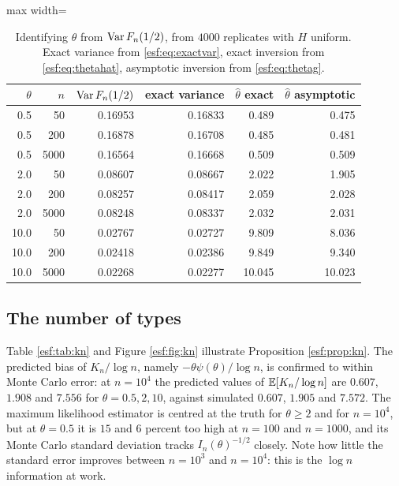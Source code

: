 \begin{table}[htbp]
\centering
\caption{Identifying $\theta$ from $\operatorname{Var} F_n(1/2)$, from $4000$ replicates with $H$
uniform. Exact variance from \eqref{esf:eq:exactvar}, exact inversion from
\eqref{esf:eq:thetahat}, asymptotic inversion from \eqref{esf:eq:thetag}.}
\label{esf:tab:var}
\begin{adjustbox}{max width=\textwidth}
\begin{tabular}{rrrrrr}
\toprule
$\theta$ & $n$ & $\operatorname{Var} F_n(1/2)$ & exact variance & $\hat\theta$ exact & $\hat\theta$ asymptotic \\
\midrule
0.5 &   50 & 0.16953 & 0.16833 & 0.489 & 0.475 \\
0.5 &  200 & 0.16878 & 0.16708 & 0.485 & 0.481 \\
0.5 & 5000 & 0.16564 & 0.16668 & 0.509 & 0.509 \\
2.0 &   50 & 0.08607 & 0.08667 & 2.022 & 1.905 \\
2.0 &  200 & 0.08257 & 0.08417 & 2.059 & 2.028 \\
2.0 & 5000 & 0.08248 & 0.08337 & 2.032 & 2.031 \\
10.0 &   50 & 0.02767 & 0.02727 & 9.809 & 8.036 \\
10.0 &  200 & 0.02418 & 0.02386 & 9.849 & 9.340 \\
10.0 & 5000 & 0.02268 & 0.02277 & 10.045 & 10.023 \\
\bottomrule
\end{tabular}
\end{adjustbox}
\end{table}

\subsection{The number of types}

Table \ref{esf:tab:kn} and Figure \ref{esf:fig:kn} illustrate Proposition \ref{esf:prop:kn}. The
predicted bias of $K_n/\log n$, namely $-\theta \psi(\theta)/\log n$, is confirmed to
within Monte Carlo error: at $n = 10^{4}$ the predicted values of $\mathbb{E}[K_n/\log n]$ are
$0.607$, $1.908$ and $7.556$ for $\theta = 0.5, 2, 10$, against simulated $0.607$,
$1.905$ and $7.572$. The maximum likelihood estimator is centred at the truth for $\theta \ge 2$ and for $n = 10^{4}$, but at $\theta = 0.5$ it is $15$ and $6$ percent too high at $n = 100$ and $n = 1000$, and its Monte Carlo standard deviation tracks $I_n(\theta)^{-1/2}$ closely. Note
how little the standard error improves between $n = 10^{3}$ and $n = 10^{4}$: this is
the $\log n$ information at work.

